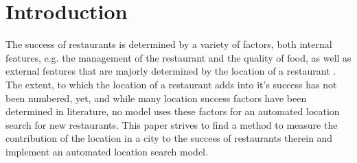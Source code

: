 \documentclass[a4paper, 11pt, oneside]{Thesis}  %
\begin{document}
{

}

{
}





\mainmatter	  %
\pagestyle{fancy}  %


\chapter{Introduction}
\label{Introduction}

The success of restaurants is determined by a variety of factors, both internal features, e.g. the management of the restaurant and the quality of food, as well as external features that are majorly determined by the location of a restaurant \cite{Parsa.2005}. The extent, to which the location of a restaurant adds into it's success has not been numbered, yet, and while many location success factors have been determined in literature, no model uses these factors for an automated location search for new restaurants. This paper strives to find a method to measure the contribution of the location in a city to the success of restaurants therein and implement an automated location search model.
\end{document}
